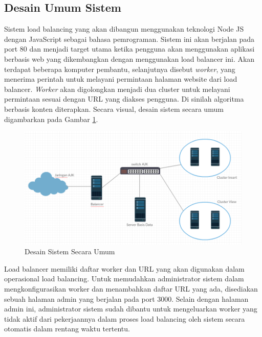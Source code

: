 \documentclass{ta-its}
\begin{document}
		    \subsection{Desain Umum Sistem}
			    Sistem load balancing yang akan dibangun menggunakan teknologi Node JS dengan JavaScript sebagai bahasa pemrograman. Sistem ini akan berjalan pada port 80 dan menjadi target utama ketika pengguna akan menggunakan aplikasi berbasis web yang dikembangkan dengan menggunakan load balancer ini. Akan terdapat beberapa komputer pembantu, selanjutnya disebut \textit{worker}, yang menerima perintah untuk melayani permintaan halaman website dari load balancer. \textit{Worker} akan digolongkan menjadi dua cluster untuk melayani permintaan sesuai dengan URL yang diakses pengguna. Di sinilah algoritma berbasis konten diterapkan. Secara visual, desain sistem secara umum digambarkan pada Gambar \ref{gambarSistem}.
			    
			    \begin{figure}[h] %
			    	\centering
			    	\includegraphics[width=\linewidth]{contoh_img/sistem}
			    	\caption{Desain Sistem Secara Umum}
			    	\label{gambarSistem}
			    \end{figure}
			    
			    Load balancer memiliki daftar worker dan URL yang akan digunakan dalam operasional load balancing. Untuk memudahkan administrator sistem dalam mengkonfigurasikan worker dan menambahkan daftar URL yang ada, disediakan sebuah halaman admin yang berjalan pada port 3000. Selain dengan halaman admin ini, administrator sistem sudah dibantu untuk mengeluarkan worker yang tidak aktif dari pekerjaannya dalam proses load balancing oleh sistem secara otomatis dalam rentang waktu tertentu.
			    
			    
			    
\end{document}
